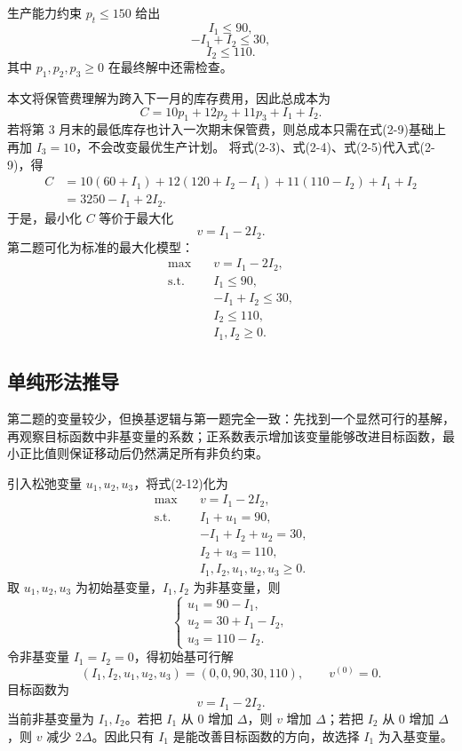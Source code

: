 ﻿\documentclass[UTF8,zihao=-4,fontset=none]{ctexart}
\begin{document}
生产能力约束 \(p_t\le 150\) 给出
\[
    I_1\le 90, \tag{2-6}
\]
\[
    -I_1+I_2\le 30, \tag{2-7}
\]
\[
    I_2\le 110. \tag{2-8}
\]
其中 \(p_1,p_2,p_3\ge 0\) 在最终解中还需检查。

本文将保管费理解为跨入下一月的库存费用，因此总成本为
\[
    C=10p_1+12p_2+11p_3+I_1+I_2. \tag{2-9}
\]
若将第 \(3\) 月末的最低库存也计入一次期末保管费，则总成本只需在式(2-9)基础上再加 \(I_3=10\)，不会改变最优生产计划。
将式(2-3)、式(2-4)、式(2-5)代入式(2-9)，得
\[
\begin{aligned}
    C
    &=10(60+I_1)+12(120+I_2-I_1)+11(110-I_2)+I_1+I_2\\
    &=3250-I_1+2I_2.
\end{aligned} \tag{2-10}
\]
于是，最小化 \(C\) 等价于最大化
\[
    v=I_1-2I_2. \tag{2-11}
\]
第二题可化为标准的最大化模型：
\[
    \begin{aligned}
    \max\quad & v=I_1-2I_2,\\
    \mathrm{s.t.}\quad
      &I_1\le 90,\\
      &-I_1+I_2\le 30,\\
      &I_2\le 110,\\
      &I_1,I_2\ge 0.
    \end{aligned} \tag{2-12}
\]

\subsection{单纯形法推导}

第二题的变量较少，但换基逻辑与第一题完全一致：先找到一个显然可行的基解，再观察目标函数中非基变量的系数；正系数表示增加该变量能够改进目标函数，最小正比值则保证移动后仍然满足所有非负约束。

引入松弛变量 \(u_1,u_2,u_3\)，将式(2-12)化为
\[
    \begin{aligned}
    \max\quad & v=I_1-2I_2,\\
    \mathrm{s.t.}\quad
      &I_1+u_1=90,\\
      &-I_1+I_2+u_2=30,\\
      &I_2+u_3=110,\\
      &I_1,I_2,u_1,u_2,u_3\ge 0.
    \end{aligned} \tag{2-13}
\]
取 \(u_1,u_2,u_3\) 为初始基变量，\(I_1,I_2\) 为非基变量，则
\[
    \begin{cases}
    u_1=90-I_1,\\
    u_2=30+I_1-I_2,\\
    u_3=110-I_2.
    \end{cases} \tag{2-14}
\]
令非基变量 \(I_1=I_2=0\)，得初始基可行解
\[
    (I_1,I_2,u_1,u_2,u_3)=(0,0,90,30,110),\qquad v^{(0)}=0. \tag{2-15}
\]
目标函数为
\[
    v=I_1-2I_2. \tag{2-16}
\]
当前非基变量为 \(I_1,I_2\)。若把 \(I_1\) 从 \(0\) 增加 \(\Delta\)，则 \(v\) 增加 \(\Delta\)；若把 \(I_2\) 从 \(0\) 增加 \(\Delta\)，则 \(v\) 减少 \(2\Delta\)。因此只有 \(I_1\) 是能改善目标函数的方向，故选择 \(I_1\) 为入基变量。
\end{document}
